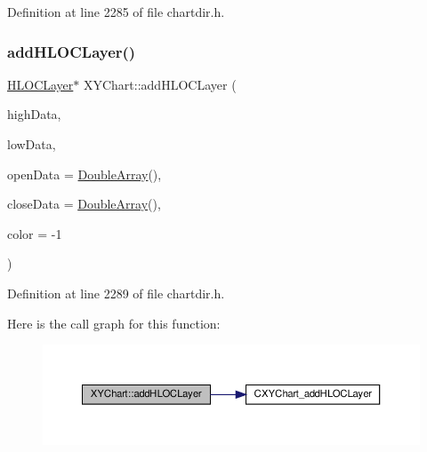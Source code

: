 Definition at line 2285 of file chartdir.\+h.

\mbox{\label{class_x_y_chart_a963f78dc8d5d36ffa3fabcfbbedf4a89}} 
\subsubsection{\texorpdfstring{add\+H\+L\+O\+C\+Layer()}{addHLOCLayer()}\hspace{0.1cm}{\footnotesize\ttfamily [3/4]}}
{\footnotesize\ttfamily \hyperlink{class_h_l_o_c_layer}{H\+L\+O\+C\+Layer}$\ast$ X\+Y\+Chart\+::add\+H\+L\+O\+C\+Layer (\begin{DoxyParamCaption}\item[{\hyperlink{class_double_array}{Double\+Array}}]{high\+Data,  }\item[{\hyperlink{class_double_array}{Double\+Array}}]{low\+Data,  }\item[{\hyperlink{class_double_array}{Double\+Array}}]{open\+Data = {\ttfamily \hyperlink{class_double_array}{Double\+Array}()},  }\item[{\hyperlink{class_double_array}{Double\+Array}}]{close\+Data = {\ttfamily \hyperlink{class_double_array}{Double\+Array}()},  }\item[{int}]{color = {\ttfamily -\/1} }\end{DoxyParamCaption})\hspace{0.3cm}{\ttfamily [inline]}}



Definition at line 2289 of file chartdir.\+h.

Here is the call graph for this function\+:
\nopagebreak
\begin{figure}[H]
\begin{center}
\leavevmode
\includegraphics[width=350pt]{class_x_y_chart_a963f78dc8d5d36ffa3fabcfbbedf4a89_cgraph}
\end{center}
\end{figure}
\mbox{\label{class_x_y_chart_a40850db454a426061148872d99ba382e}} 
